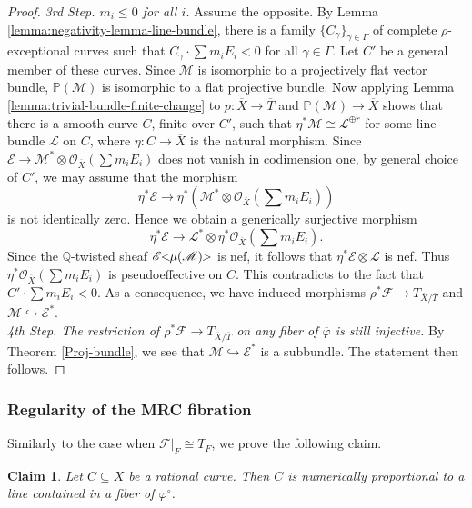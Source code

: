 \documentclass[english,reqno]{amsart}
\newcommand\bbP{{\mathbb P}}
\newcommand\sE{{\mathscr E}}
\newcommand\sF{{\mathscr F}}
\newcommand\sL{{\mathscr L}}
\newcommand\sM{{\mathscr M}}
\newcommand\sO{{\mathscr O}}
\theoremstyle{plain}
\newtheorem{claim}[thm]{Claim}
\theoremstyle{definition}
\numberwithin{equation}{section} %
\begin{document}
\begin{proof}
	
	\textit{3rd Step.  $m_i \leqslant 0$ for all $i$.}
	Assume the opposite. By Lemma \ref{lemma:negativity-lemma-line-bundle}, there is a family $\{C_\gamma\}_{\gamma\in \Gamma}$ of complete $\rho$-exceptional curves  such that $C_\gamma\cdot \sum m_iE_i<0$ for all $\gamma\in \Gamma$.
	Let $C'$ be a general member of these curves. Since $\sM$ is isomorphic to a projectively flat vector bundle, $\bbP(\sM)$ is isomorphic to a flat projective bundle. Now applying Lemma \ref{lemma:trivial-bundle-finite-change} to $p\colon \overline{X}\rightarrow \overline{T}$ and $\bbP(\sM)\rightarrow \overline{X}$ shows that   there is a smooth  curve $C$, finite over $C'$, such that  $\eta^*\sM \cong \sL^{\oplus r}$ for some line bundle $\sL$ on $C$, where $\eta\colon C\to \overline{X}$ is the natural morphism. Since $\sE\rightarrow \sM^*\otimes \sO_{\overline{X}}(\sum m_i E_i)$ does not vanish in codimension one, by general choice of $C'$, we may assume that the morphism $$\eta^*\sE \to \eta^*(\sM^* \otimes  \sO_{\overline{X}}(\sum m_i E_i))$$ is not identically zero.
	Hence we obtain a generically surjective morphism
	$$\eta^*\sE \to \sL^*\otimes \eta^*\sO_{\overline{X}}(\sum m_i E_i).$$
	Since the $\mathbb{Q}$-twisted sheaf $\sE\hspace{-0.8ex}<\hspace{-0.8ex}\mu(\sM)\hspace{-0.8ex}>$ is nef, it follows that $\eta^*\sE\otimes \sL$ is nef. Thus $\eta^*\sO_{\overline{X}}(\sum m_i E_i)$ is pseudoeffective on $C$. This contradicts to the fact that   $C'\cdot \sum m_iE_i<0$. As a consequence, we have  induced morphisms  $\rho^*\sF \to T_{\overline{X}/\overline{T}}$ and $\sM \hookrightarrow \sE^*$.\\
	
	\textit{4th Step. The restriction of $\rho^*\sF \to T_{\overline{X}/\overline{T}}$ on any fiber of $\overline{\varphi}$ is still injective.}  By Theorem \ref{Proj-bundle}, we see that  $\sM\hookrightarrow \sE^*$ is a subbundle.  The statement then follows.
\end{proof}

\subsubsection{Regularity of the MRC fibration}

Similarly to the case when $\sF\vert_F\cong T_F$, we prove the following claim.

\begin{claim}\label{claim:extremal-ray-F=O1}
	Let $C\subseteq X$ be a rational curve. Then $C$ is numerically proportional to a line contained in a fiber  of $\varphi^\circ$.
\end{claim}
\end{document}

